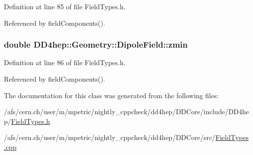 Definition at line 85 of file FieldTypes.h.

Referenced by fieldComponents().\hypertarget{class_d_d4hep_1_1_geometry_1_1_dipole_field_a871a5339aaac0458cf912b44317d5eed}{
\subsubsection[{zmin}]{\setlength{\rightskip}{0pt plus 5cm}double {\bf DD4hep::Geometry::DipoleField::zmin}}}
\label{class_d_d4hep_1_1_geometry_1_1_dipole_field_a871a5339aaac0458cf912b44317d5eed}


Definition at line 86 of file FieldTypes.h.

Referenced by fieldComponents().

The documentation for this class was generated from the following files:\begin{DoxyCompactItemize}
\item 
/afs/cern.ch/user/m/mpetric/nightly\_\-cppcheck/dd4hep/DDCore/include/DD4hep/\hyperlink{_field_types_8h}{FieldTypes.h}\item 
/afs/cern.ch/user/m/mpetric/nightly\_\-cppcheck/dd4hep/DDCore/src/\hyperlink{_field_types_8cpp}{FieldTypes.cpp}\end{DoxyCompactItemize}
